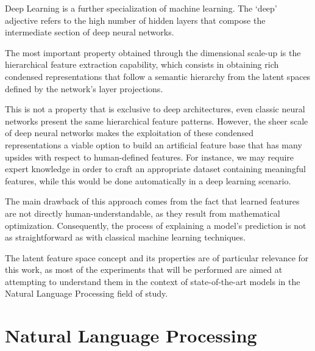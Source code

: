Deep Learning is a further specialization of machine learning.
The `deep' adjective refers to the high number of hidden layers that compose the intermediate section of deep neural networks.

The most important property obtained through the dimensional scale-up is the hierarchical feature extraction capability, which consists in obtaining rich condensed representations that follow a semantic hierarchy from the latent spaces defined by the network's layer projections.

\begin{figure}[t!]
    \centering
    \quad
    \caption{}
    \label{fig:background_fex_deep-fex}
\end{figure}

This is not a property that is exclusive to deep architectures, even classic neural networks present the same hierarchical feature patterns.
However, the sheer scale of deep neural networks makes the exploitation of these condensed representations a viable option to build an artificial feature base that has many upsides with respect to human-defined features.
For instance, we may require expert knowledge in order to craft an appropriate dataset containing meaningful features, while this would be done automatically in a deep learning scenario.

The main drawback of this approach comes from the fact that learned features are not directly human-understandable, as they result from mathematical optimization.
Consequently, the process of explaining a model's prediction is not as straightforward as with classical machine learning techniques.

The latent feature space concept and its properties are of particular relevance for this work, as most of the experiments that will be performed are aimed at attempting to understand them in the context of state-of-the-art models in the Natural Language Processing field of study.

\section{Natural Language Processing}

